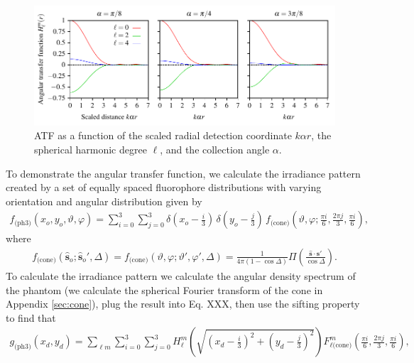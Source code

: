 \documentclass[]{osa-article}
\providecommand{\so}{\mathbf{\hat{s}}_o}
\providecommand{\mh}[1]{\mathbf{\hat{#1}}}
\begin{document}
\begin{figure}[h]
 \centering
   \centering
   \includegraphics[scale=0.8]{../figures/atf/atf.pdf}
   \caption{ATF as a function of the scaled radial detection coordinate
     $k\alpha r$, the spherical harmonic degree $\ell$, and the collection angle
     $\alpha$. 
   }
   \label{fig:atf}
 \end{figure}

 To demonstrate the angular transfer function, we calculate the irradiance
 pattern created by a set of equally spaced fluorophore distributions with
 varying orientation and angular distribution given by
 \begin{align}
   f_{\text{(ph3)}}(x_o, y_o, \vartheta, \varphi) = \sum_{i=0}^3 \sum_{j=0}^3 \delta\left(x_o - \frac{i}{3}\right)\, \delta\left(y_o - \frac{j}{3}\right)\, f_{\text{(cone)}}\left(\vartheta, \varphi; \frac{\pi i}{6}, \frac{2\pi j}{3}, \frac{\pi i}{6}\right),\label{eq:phantom3}
 \end{align}
 where
 \begin{align}
   f_{\text{(cone)}}(\so; \so', \Delta) = f_{\text{(cone)}}(\vartheta, \varphi; \vartheta', \varphi', \Delta) = \frac{1}{4\pi(1 - \cos\Delta)}\Pi\left(\frac{\mh{s}\cdot\mh{s}'}{\cos\Delta}\right).
 \end{align}
 To calculate the irradiance pattern we calculate the angular density spectrum
 of the phantom (we calculate the spherical Fourier transform of the cone in
 Appendix \ref{sec:cone}), plug the result into Eq. XXX, then use the sifting
 property to find that
 \begin{align}
   g_{\text{(ph3)}}(x_d, y_d) = \sum_{\ell m}\sum_{i=0}^3 \sum_{j=0}^3 H_\ell^m\left(\sqrt{\left(x_d - \frac{i}{3}\right)^2 + \left(y_d - \frac{j}{3}\right)^2}\right) F_{\ell\text{(cone)}}^m\left(\frac{\pi i}{6}, \frac{2\pi j}{3}, \frac{\pi i}{6}\right),\label{eq:phantom3}
 \end{align}
\end{document}
